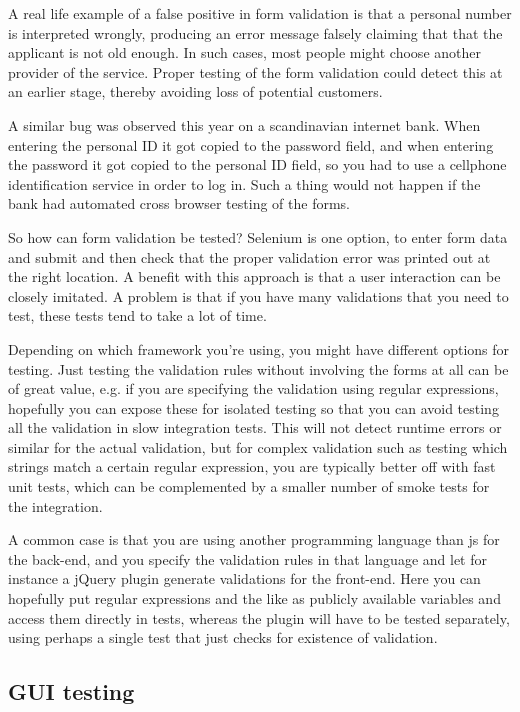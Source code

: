 \documentclass[11pt]{article}
\begin{document}
A real life example of a false positive in form validation is that a personal number is interpreted wrongly, producing an error message falsely claiming that that the applicant is not old enough. In such cases, most people might choose another provider of the service. Proper testing of the form validation could detect this at an earlier stage, thereby avoiding loss of potential customers. \cite{TwitterMe}

A similar bug was observed this year on a scandinavian internet bank. When entering the personal ID it got copied to the password field, and when entering the password it got copied to the personal ID field, so you had to use a cellphone identification service in order to log in. Such a thing would not happen if the bank had automated cross browser testing of the forms. \cite[question~38]{Ahnve}

So how can form validation be tested? Selenium is one option, to enter form data and submit and then check that the proper validation error was printed out at the right location. A benefit with this approach is that a user interaction can be closely imitated. A problem is that if you have many validations that you need to test, these tests tend to take a lot of time.

Depending on which framework you're using, you might have different options for testing. Just testing the validation rules without involving the forms at all can be of great value, e.g. if you are specifying the validation using regular expressions, hopefully you can expose these for isolated testing so that you can avoid testing all the validation in slow integration tests. This will not detect runtime errors or similar for the actual validation, but for complex validation such as testing which strings match a certain regular expression, you are typically better off with fast unit tests, which can be complemented by a smaller number of smoke tests for the integration.

A common case is that you are using another programming language than \gls{js} for the back-end, and you specify the validation rules in that language and let for instance a jQuery plugin generate validations for the front-end. Here you can hopefully put regular expressions and the like as publicly available variables and access them directly in tests, whereas the plugin will have to be tested separately, using perhaps a single test that just checks for existence of validation.

\subsection{GUI testing}
\end{document}
